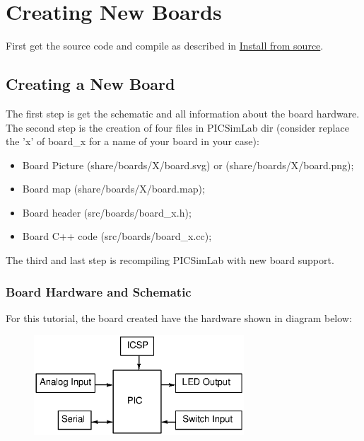 \chapter{Creating New Boards}

First get the source code and compile as described in \hyperlink{def:isource}{Install from source}.

\section{Creating a New Board}

The first step is get the schematic and all information about the board hardware.
The second step is the creation of four files in PICSimLab dir (consider replace the 'x' of board\_x for a name of your board in your case):
\begin{itemize}
\item Board Picture (share/boards/X/board.svg) or (share/boards/X/board.png);
\item Board map (share/boards/X/board.map);
\item Board header (src/boards/board\_x.h);
\item Board C++ code (src/boards/board\_x.cc);
\end{itemize}

The third and last step is recompiling PICSimLab with new board support.

\subsection{Board Hardware and Schematic}

For this tutorial, the board created have the hardware shown in diagram below:
\begin{figure}[H]
\center
\includegraphics[width=0.7\textwidth]{img/hb/blocks.eps} 
\end{figure} 

